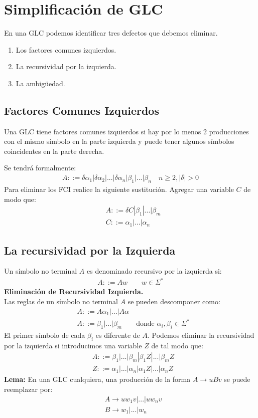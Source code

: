 \chapter{Simplificación de GLC}

En una GLC podemos identificar tres defectos que debemos eliminar.
\begin{enumerate}
\item Los factores comunes izquierdos.
\item La recursividad por la izquierda.
\item La ambigüedad.
\end{enumerate}

\section{Factores Comunes Izquierdos}
Una GLC tiene factores comunes izquierdos si hay por lo menos 2 producciones con el mismo símbolo en la parte izquierda y puede tener algunos símbolos coincidentes en la parte derecha.

Se tendrá formalmente:
\begin{align*}
A::=\delta\alpha_1|\delta\alpha_2|...|\delta\alpha_n|\beta_1|...|\beta_n	\quad n\geq 2, |\delta|>0
\end{align*}
Para eliminar los FCI realice la siguiente sustitución. Agregar una variable $C$ de modo que: 
\begin{align*}
&A::=\delta C|\beta_1|...|\beta_m	\\
&C::=\alpha_1|...|\alpha_n
\end{align*}

\section{La recursividad por la Izquierda}
Un símbolo no terminal $A$ es denominado recursivo por la izquierda si:
\begin{align*}
A::=Aw\qquad w\in\Sigma^*
\end{align*}
\textbf{Eliminación de Recursividad Izquierda.}\\

Las reglas de un símbolo no terminal $A$ se pueden descomponer como:
\begin{align*}
&A::=A\alpha_1|...|A\alpha	\\
&A::=\beta_1|...|\beta_m	\qquad \mbox{donde }\alpha_i,\beta_i\in\Sigma^*
\end{align*}
El primer símbolo de cada $\beta_i$ es diferente de $A$. Podemos eliminar la recursividad por la izquierda si introducimos una variable $Z$ de tal modo que:
\begin{align*}
&A::=\beta_1|...|\beta_m|\beta_1Z|...|\beta_mZ	\\
&Z::=\alpha_1|...|\alpha_n|\alpha_1Z|...|\alpha_nZ
\end{align*}
\textbf{Lema: }En una GLC cualquiera, una producción de la forma $A\rightarrow uBv$ se puede reemplazar por:
\begin{align*}
&A\rightarrow uw_1v|...|uw_nv	\\
&B\rightarrow w_1|...|w_n
\end{align*}

